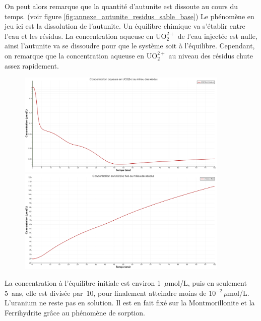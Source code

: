 \documentclass{article}
\begin{document}
On peut alors remarque que la quantité d’autunite est dissoute au cours du temps. (voir figure \ref{fig:annexe_autunite_residus_sable_base}) Le phénomène en jeu ici est la dissolution de l’autunite. Un équilibre chimique va s’établir entre l’eau et les résidus. La concentration aqueuse en UO$_2^{2+}$ de l’eau injectée est nulle, ainsi l’autunite va se dissoudre pour que le système soit à l’équilibre. Cependant, on remarque que la concentration aqueuse en UO$_2^{2+}$ au niveau des résidus chute assez rapidement.


\begin{figure}[H]
    \centering
    \begin{minipage}{0.5\textwidth}
        \centering
        \includegraphics[width=0.9\textwidth]{III_B_2_3.png} 
        \caption{}
        \label{fig:UO2_residus_sable_base}
    \end{minipage}\hfill
    \begin{minipage}{0.5\textwidth}
        \centering
        \includegraphics[width=0.9\textwidth]{III_B_2_4.png} 
        \caption{}
        \label{fig:UO2_fixe_residus_sable_base}
    \end{minipage}
\end{figure}

La concentration à l’équilibre initiale est environ 1~$\mu$mol/L, puis en seulement 5~ans, elle est divisée par~10, pour finalement atteindre moins de $10^{-2} \, \mu$mol/L. L’uranium ne reste pas en solution. Il est en fait fixé sur la Montmorillonite et la Ferrihydrite grâce au phénomène de sorption.
\end{document}
